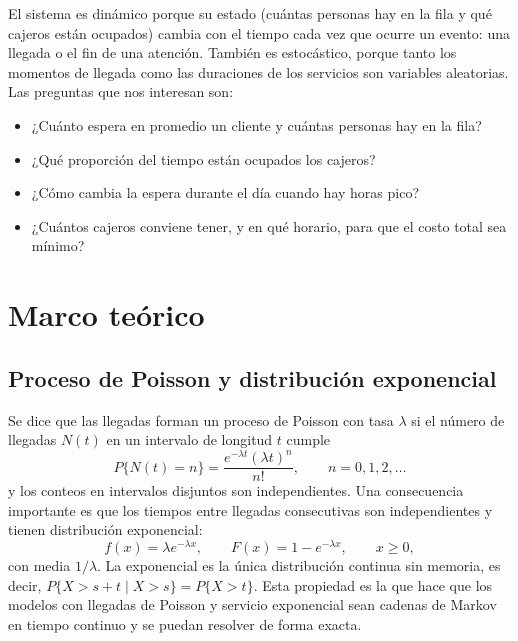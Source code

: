 \documentclass[11pt,letterpaper]{article}
\begin{document}
El sistema es dinámico porque su estado (cuántas personas hay en la fila y qué cajeros
están ocupados) cambia con el tiempo cada vez que ocurre un evento: una llegada o el fin
de una atención. También es estocástico, porque tanto los momentos de llegada como las
duraciones de los servicios son variables aleatorias. Las preguntas que nos interesan son:
\begin{itemize}[noitemsep]
  \item ¿Cuánto espera en promedio un cliente y cuántas personas hay en la fila?
  \item ¿Qué proporción del tiempo están ocupados los cajeros?
  \item ¿Cómo cambia la espera durante el día cuando hay horas pico?
  \item ¿Cuántos cajeros conviene tener, y en qué horario, para que el costo total sea mínimo?
\end{itemize}

\section{Marco teórico}

\subsection{Proceso de Poisson y distribución exponencial}
Se dice que las llegadas forman un proceso de Poisson con tasa $\lambda$ si el número de
llegadas $N(t)$ en un intervalo de longitud $t$ cumple
\begin{equation}
  P\{N(t)=n\} = \frac{e^{-\lambda t}(\lambda t)^n}{n!}, \qquad n = 0,1,2,\dots
\end{equation}
y los conteos en intervalos disjuntos son independientes. Una consecuencia importante es
que los tiempos entre llegadas consecutivas son independientes y tienen distribución
exponencial:
\begin{equation}
  f(x) = \lambda e^{-\lambda x}, \qquad F(x) = 1 - e^{-\lambda x}, \qquad x \ge 0,
\end{equation}
con media $1/\lambda$. La exponencial es la única distribución continua sin memoria, es
decir, $P\{X > s+t \mid X > s\} = P\{X > t\}$. Esta propiedad es la que hace que los
modelos con llegadas de Poisson y servicio exponencial sean cadenas de Markov en tiempo
continuo y se puedan resolver de forma exacta.
\end{document}
